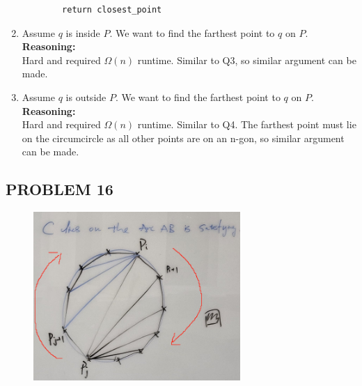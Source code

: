 \documentclass{article}
\begin{document}
\begin{enumerate}
\begin{verbatim}
        return closest_point
    \end{verbatim}
    \item Assume $q$ is inside $P$. We want to find the farthest point to $q$ on $P$.
    \\
    \textbf{Reasoning: }
    \\
    Hard and required $\Omega(n)$ runtime. Similar to Q3, so similar argument can be made.
    \item Assume $q$ is outside $P$. We want to find the farthest point to $q$ on $P$.
    \\
    \textbf{Reasoning: }
    \\
    Hard and required $\Omega(n)$ runtime. Similar to Q4. The farthest point must lie on the circumcircle as all other points are on an n-gon, so similar argument can be made.
\end{enumerate}

\newpage

\subsection*{PROBLEM 16}

\begin{figure}[h]
    \centering
    \includegraphics[width=0.7\textwidth]{HW5_Q2.png}
    \label{fig:q2PROOF}
\end{figure}
\end{document}
